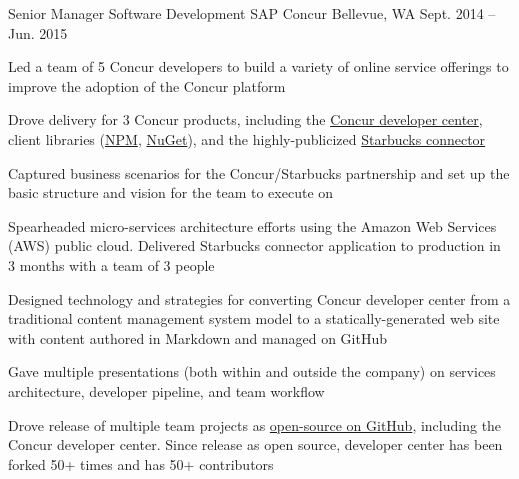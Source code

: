 \begin{cventries}
\cventry
{Senior Manager Software Development}
{SAP Concur}
{Bellevue, WA}
{Sept. 2014 – Jun. 2015}
{
  \begin{cvitems}
  \item {Led a team of 5 Concur developers to build a variety of online service offerings to improve the adoption of the Concur platform}
  \item {Drove delivery for 3 Concur products, including the \href{https://developer.concur.com}{Concur developer center}, client libraries (\href{https://www.npmjs.com/package/concur}{NPM}, \href{https://www.nuget.org/packages/ConcurPlatform/}{NuGet}), and the highly-publicized \href{http://www.bloomberg.com/news/videos/2015-02-23/concur-taking-the-pain-out-of-expense-reports}{Starbucks connector}}
  \item {Captured business scenarios for the Concur/Starbucks partnership and set up the basic structure and vision for the team to execute on}
  \item {Spearheaded micro-services architecture efforts using the Amazon Web Services (AWS) public cloud. Delivered Starbucks connector application to production in 3 months with a team of 3 people}
  \item {Designed technology and strategies for converting Concur developer center from a traditional content management system model to a statically-generated web site with content authored in Markdown and managed on GitHub}
  \item {Gave multiple presentations (both within and outside the company) on services architecture, developer pipeline, and team workflow}
  \item {Drove release of multiple team projects as \href{https://github.com/concur}{open-source on GitHub}, including the Concur developer center. Since release as open source, developer center has been forked 50+ times and has 50+ contributors}
  \end{cvitems}
}



\end{cventries}

